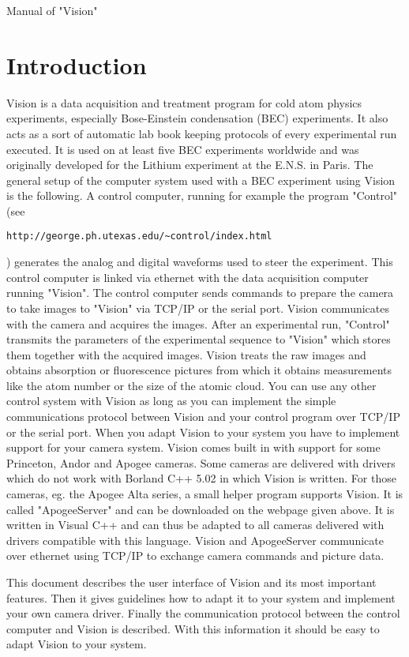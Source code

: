 \documentclass[10pt]{article}
\begin{document}
{\huge{Manual of "Vision"}}

\section{Introduction}

Vision is a data acquisition and treatment program for cold atom
physics experiments, especially Bose-Einstein condensation (BEC)
experiments. It also acts as a sort of automatic lab book keeping
protocols of every experimental run executed. It is used on at
least five BEC experiments worldwide and was originally developed
for the Lithium experiment at the E.N.S. in Paris. The general
setup of the computer system used with a BEC experiment using
Vision is the following. A control computer, running for example
the program "Control" (see
\begin{verbatim}http://george.ph.utexas.edu/~control/index.html\end{verbatim})
generates the analog and digital waveforms used to steer the
experiment. This control computer is linked via ethernet with the
data acquisition computer running "Vision". The control computer
sends commands to prepare the camera to take images to "Vision"
via TCP/IP or the serial port. Vision communicates with the camera
and acquires the images. After an experimental run, "Control"
transmits the parameters of the experimental sequence to "Vision"
which stores them together with the acquired images. Vision treats
the raw images and obtains absorption or fluorescence pictures
from which it obtains measurements like the atom number or the
size of the atomic cloud. You can use any other control system
with Vision as long as you can implement the simple communications
protocol between Vision and your control program over TCP/IP or
the serial port. When you adapt Vision to your system you have to
implement support for your camera system. Vision comes built in
with support for some Princeton, Andor and Apogee cameras. Some
cameras are delivered with drivers which do not work with Borland
C++ 5.02 in which Vision is written. For those cameras, eg. the
Apogee Alta series, a small helper program supports Vision. It is
called "ApogeeServer" and can be downloaded on the webpage given
above. It is written in Visual C++ and can thus be adapted to all
cameras delivered with drivers compatible with this language.
Vision and ApogeeServer communicate over ethernet using TCP/IP to
exchange camera commands and picture data.

This document describes the user interface of Vision and its most
important features. Then it gives guidelines how to adapt it to
your system and implement your own camera driver. Finally the
communication protocol between the control computer and Vision is
described. With this information it should be easy to adapt Vision
to your system.
\end{document}
